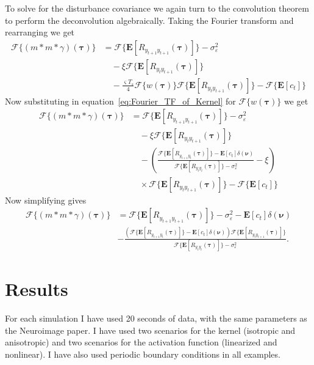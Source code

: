 \documentclass[conference,onecolumn]{IEEEtran}
\begin{document}
To solve for the disturbance covariance we again turn to the convolution theorem to perform the deconvolution algebraically. Taking the Fourier transform and rearranging we get
\begin{align}
	\mathcal{F}\{(m\ast m \ast \gamma)(\boldsymbol\tau)\} &= \mathcal{F}\{\mathbf{E}[R_{y_{t+1}y_{t+1}}(\boldsymbol{\tau})]\}-\sigma_{\varepsilon}^2 \nonumber \\ 
	&\quad-\xi \mathcal{F}\{\mathbf{E}[R_{y_ty_{t+1}}(\boldsymbol{\tau})]\} \nonumber \\
	&\quad - \frac{\varsigma T_s}{4} \mathcal{F}\{w(\boldsymbol{\tau})\}\mathcal{F}\{ \mathbf{E}[R_{y_ty_{t+1}}(\boldsymbol\tau)]\}  - \mathcal{F}\{\mathbf{E}[c_t]\}
\end{align}
Now substituting in equation~\ref{eq:Fourier_TF_of_Kernel} for $\mathcal{F}\{w(\boldsymbol{\tau})\}$ we get
\begin{align}
	\mathcal{F}\{(m\ast m \ast \gamma)(\boldsymbol\tau)\} &= \mathcal{F}\{\mathbf{E}[R_{y_{t+1}y_{t+1}}(\boldsymbol{\tau})]\} -\sigma_{\varepsilon}^2 \nonumber \\ 
	&\quad-\xi \mathcal{F}\{\mathbf{E}[R_{y_ty_{t+1}}(\boldsymbol{\tau})]\} \nonumber \\
	&\quad - \left(\frac{\mathcal{F}\{\mathbf{E}[R_{y_{t+1}y_t}(\boldsymbol{\tau})]\} - \mathbf{E}\left[c_t\right]\delta(\boldsymbol{\nu})}{\mathcal{F}\{\mathbf{E}\left[R_{y_ty_t}(\boldsymbol\tau)\right]\} - \sigma_{\varepsilon}^2 } - \xi\right) \nonumber\\
	&\quad\times\mathcal{F}\{ \mathbf{E}[R_{y_ty_{t+1}}(\boldsymbol\tau)]\} - \mathcal{F}\{\mathbf{E}[c_t]\}
\end{align}
Now simplifying gives
\begin{align}
	\mathcal{F}\{(m\ast m \ast \gamma)(\boldsymbol\tau)\} &= \mathcal{F}\{\mathbf{E}[R_{y_{t+1}y_{t+1}}(\boldsymbol{\tau})]\} -\sigma_{\varepsilon}^2 - \mathbf{E}\left[c_t\right]\delta(\boldsymbol{\nu}) \nonumber \\
	&- \frac{(\mathcal{F}\{\mathbf{E}[R_{y_{t+1}y_t}(\boldsymbol{\tau})]\} - \mathbf{E}\left[c_t\right]\delta(\boldsymbol{\nu}))\mathcal{F}\{ \mathbf{E}[R_{y_ty_{t+1}}(\boldsymbol\tau)]\}}{\mathcal{F}\{\mathbf{E}\left[R_{y_ty_t}(\boldsymbol\tau)\right]\} - \sigma_{\varepsilon}^2 }.	
\end{align}
\section{Results}

For each simulation I have used 20 seconds of data, with the same parameters as the Neuroimage paper.
I have used two scenarios for the kernel (isotropic and anisotropic) and two scenarios for the activation function (linearized and nonlinear). I have also used periodic boundary conditions in all examples.
\end{document}
